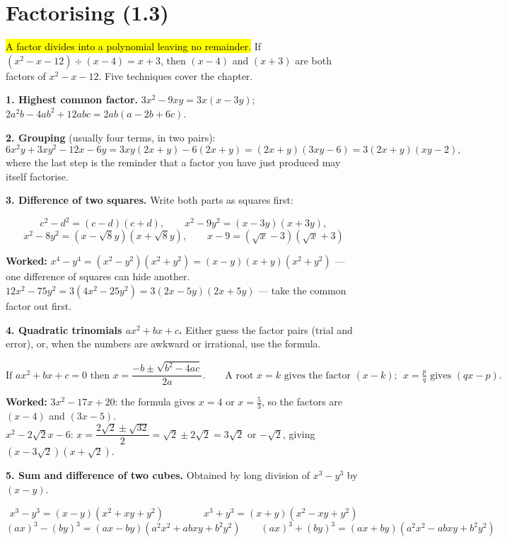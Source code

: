 \documentclass[11pt]{article}
\newcommand{\key}[1]{\hl{#1}}
\newcommand{\wex}[1]{\textbf{\color{lilacdeep}Worked:} #1}
\begin{document}
\section{Factorising (1.3)}

\key{A factor divides into a polynomial leaving no remainder.} If $(x^{2}-x-12)\div(x-4)=x+3$, then $(x-4)$ and $(x+3)$ are both factors of $x^{2}-x-12$. Five techniques cover the chapter.

\textbf{1. Highest common factor.} $3x^{2}-9xy=3x(x-3y)$; $2a^{2}b-4ab^{2}+12abc=2ab(a-2b+6c)$.

\textbf{2. Grouping} (usually four terms, in two pairs):
\[6x^{2}y+3xy^{2}-12x-6y=3xy(2x+y)-6(2x+y)=(2x+y)(3xy-6)=3(2x+y)(xy-2),\]
where the last step is the reminder that a factor you have just produced may itself factorise.

\textbf{3. Difference of two squares.} Write both parts as squares first:
\begin{formulabox}
\[c^{2}-d^{2}=(c-d)(c+d),\qquad x^{2}-9y^{2}=(x-3y)(x+3y),\]
\[x^{2}-8y^{2}=\left(x-\sqrt8 y\right)\left(x+\sqrt8 y\right),\qquad x-9=\left(\sqrt x-3\right)\left(\sqrt x+3\right)\]
\end{formulabox}

\wex{$x^{4}-y^{4}=(x^{2}-y^{2})(x^{2}+y^{2})=(x-y)(x+y)(x^{2}+y^{2})$ --- one difference of squares can hide another.\\
$12x^{2}-75y^{2}=3(4x^{2}-25y^{2})=3(2x-5y)(2x+5y)$ --- take the common factor out first.}

\textbf{4. Quadratic trinomials $ax^{2}+bx+c$.} Either guess the factor pairs (trial and error), or, when the numbers are awkward or irrational, use the formula.

\begin{formulabox}
\[\text{If } ax^{2}+bx+c=0 \text{ then } x=\frac{-b\pm\sqrt{b^{2}-4ac}}{2a}.\qquad
\text{A root } x=k \text{ gives the factor } (x-k);\ \ x=\tfrac pq \text{ gives } (qx-p).\]
\end{formulabox}

\wex{$3x^{2}-17x+20$: the formula gives $x=4$ or $x=\frac53$, so the factors are $(x-4)$ and $(3x-5)$.\\
$x^{2}-2\sqrt2x-6$: $x=\dfrac{2\sqrt2\pm\sqrt{32}}{2}=\sqrt2\pm2\sqrt2=3\sqrt2$ or $-\sqrt2$, giving $\left(x-3\sqrt2\right)\left(x+\sqrt2\right)$.}

\textbf{5. Sum and difference of two cubes.} Obtained by long division of $x^{3}-y^{3}$ by $(x-y)$.

\begin{formulabox}
\[x^{3}-y^{3}=(x-y)(x^{2}+xy+y^{2})\qquad\qquad x^{3}+y^{3}=(x+y)(x^{2}-xy+y^{2})\]
\[(ax)^{3}-(by)^{3}=(ax-by)(a^{2}x^{2}+abxy+b^{2}y^{2})\qquad (ax)^{3}+(by)^{3}=(ax+by)(a^{2}x^{2}-abxy+b^{2}y^{2})\]
\end{formulabox}
\end{document}
